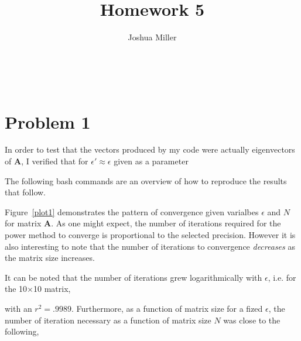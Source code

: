 

\title{Homework 5} 
\author{Joshua Miller}
\date{}






\vspace{40pt}~

\renewcommand{\m}[1]{\mathbf{#1}}

\section*{Problem 1}

In order to test that the vectors produced by my code were actually
eigenvectors of $\m{A}$, I verified that for
$\epsilon' \approx \epsilon$ given as a parameter
\al{
\sum_i \lp (\m{A}v)_i - \lambda v_i \rp^2 < \epsilon'
}

The following bash commands are an overview of how to reproduce the results that follow. 

Figure~\ref{plot1} demonstrates the pattern of convergence given
varialbes $\epsilon$ and $N$ for matrix $\m A$. As one might expect,
the number of iterations required for the power method to converge is
proportional to the selected precision.  However it is also
interesting to note that the number of iterations to
convergence \emph{decreases} as the matrix size increases. 


It can be
noted that the number of iterations grew logarithmically with
$\epsilon$, i.e. for the 10$\times$10 matrix,

with an $r^2 = .9989$. Furthermore, as a function of matrix size for a
fized $\epsilon$, the number of iteration necessary as a function of matrix size $N$ was close to the following,

